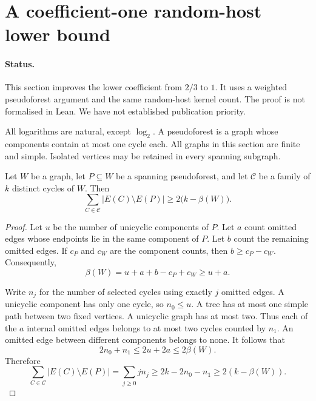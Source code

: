 \section{A coefficient-one random-host lower bound}
\label{sec:rhost-phase-two}

\paragraph{Status.}
This section improves the lower coefficient from $2/3$ to $1$.
It uses a weighted pseudoforest argument and the same random-host kernel count.
The proof is not formalised in Lean.
We have not established publication priority.

All logarithms are natural, except $\log_2$.
A pseudoforest is a graph whose components contain at most one cycle each.
All graphs in this section are finite and simple.
Isolated vertices may be retained in every spanning subgraph.

\begin{lemma}
\label{lem:rhost-pseudoforest-cycles}
Let $W$ be a graph, let $P\subseteq W$ be a spanning pseudoforest,
and let $\mathcal C$ be a family of $k$ distinct cycles of $W$.
Then
\[
 \sum_{C\in\mathcal C}|E(C)\setminus E(P)|
 \ge 2\bigl(k-\beta(W)\bigr).
\]
\end{lemma}

\begin{proof}
Let $u$ be the number of unicyclic components of $P$.
Let $a$ count omitted edges whose endpoints lie in the same component of $P$.
Let $b$ count the remaining omitted edges.
If $c_P$ and $c_W$ are the component counts, then $b\ge c_P-c_W$.
Consequently,
\[
 \beta(W)=u+a+b-c_P+c_W\ge u+a.
\]

Write $n_j$ for the number of selected cycles using exactly $j$ omitted edges.
A unicyclic component has only one cycle, so $n_0\le u$.
A tree has at most one simple path between two fixed vertices.
A unicyclic graph has at most two.
Thus each of the $a$ internal omitted edges belongs to at most two cycles counted by $n_1$.
An omitted edge between different components belongs to none.
It follows that
\[
 2n_0+n_1\le2u+2a\le2\beta(W).
\]
Therefore
\[
 \sum_{C\in\mathcal C}|E(C)\setminus E(P)|
 =\sum_{j\ge0}jn_j
 \ge2k-2n_0-n_1
 \ge2(k-\beta(W)).
\]
\end{proof}

